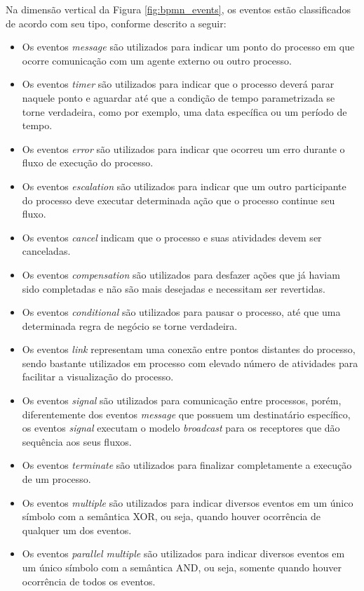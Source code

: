 \begin{enumerate}
    Na dimensão vertical da Figura \ref{fig:bpmn_events}, os eventos estão classificados de acordo com seu tipo, conforme descrito a seguir:
    \begin{itemize}
      \item  Os eventos \textit{message} são utilizados para indicar um ponto do processo em que ocorre comunicação com um agente externo ou outro processo.
      \item Os eventos \textit{timer} são utilizados para indicar que o processo deverá parar naquele ponto e aguardar até que a condição de tempo parametrizada se torne verdadeira, como por exemplo, uma data específica ou um período de tempo.
      \item Os eventos \textit{error} são utilizados para indicar que ocorreu um erro durante o fluxo de execução do processo. 
      \item Os eventos \textit{escalation} são utilizados para indicar que um outro participante do processo deve executar determinada ação que o processo continue seu fluxo.
      \item Os eventos \textit{cancel} indicam que o processo e suas atividades devem ser canceladas.
       \item Os eventos \textit{compensation} são utilizados para desfazer ações que já haviam sido completadas e não são mais desejadas e necessitam ser revertidas.
       \item Os eventos \textit{conditional} são utilizados para pausar o processo, até que uma determinada regra de negócio se torne verdadeira.
       \item Os eventos \textit{link} representam uma conexão entre pontos distantes do processo, sendo bastante utilizados em processo com elevado número de atividades para facilitar a visualização do processo. 
      \item Os eventos \textit{signal} são utilizados para comunicação entre processos, porém, diferentemente dos eventos \textit{message} que possuem um destinatário específico, os eventos \textit{signal} executam o modelo \textit{broadcast} para os receptores que dão sequência aos seus fluxos. 
      \item Os eventos \textit{terminate} são utilizados para finalizar completamente a execução de um processo. 
      \item Os eventos \textit{multiple} são utilizados para indicar diversos eventos em um único símbolo com a semântica XOR, ou seja, quando houver ocorrência de qualquer um dos eventos.
      \item Os eventos \textit{parallel multiple} são utilizados para indicar diversos eventos em um único símbolo com a semântica AND, ou seja, somente quando houver ocorrência de todos os eventos.
    \end{itemize}
     

\end{enumerate}
